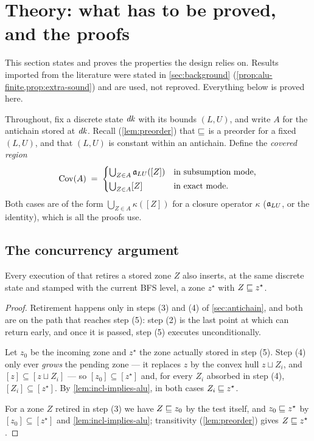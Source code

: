 \section{Theory: what has to be proved, and the proofs}
\label{sec:theory}

This section states and proves the properties the design relies on.  Results
imported from the literature were stated in \cref{sec:background}
(\cref{prop:alu-finite,prop:extra-sound}) and are used, not reproved.
Everything below is proved here.

Throughout, fix a discrete state $\mathit{dk}$ with its bounds $(L,U)$, and write
$A$ for the antichain stored at $\mathit{dk}$.  Recall (\cref{lem:preorder}) that
$\sqsubseteq$ is a preorder for a fixed $(L,U)$, and that $(L,U)$ is constant within
an antichain.  Define the \emph{covered region}
\[
  \mathrm{Cov}(A) \;=\;
  \begin{cases}
    \bigcup_{Z \in A} \mathfrak{a}_{LU}([Z]) & \text{in subsumption mode,}\\[2pt]
    \bigcup_{Z \in A} [Z]       & \text{in exact mode.}
  \end{cases}
\]
Both cases are of the form $\bigcup_{Z\in A} \kappa([Z])$ for a closure
operator $\kappa$ ($\mathfrak{a}_{LU}$, or the identity), which is all the proofs use.

\subsection{The concurrency argument}

\begin{lemma}[Replacement]\label{lem:replacement}
Every execution of  that retires a stored zone $Z$ also inserts, at
the same discrete state and stamped with the current BFS level, a zone $z^\star$
with $Z \sqsubseteq z^\star$.
\end{lemma}

\begin{proof}
Retirement happens only in steps (3) and (4) of \cref{sec:antichain}, and both
are on the path that reaches step (5): step (2) is the last point at which
 can return early, and once it is passed, step (5) executes
unconditionally.

Let $z_0$ be the incoming zone and $z^\star$ the zone actually stored in step
(5).  Step (4) only ever \emph{grows} the pending zone --- it replaces $z$ by the
convex hull $z \sqcup Z_i$, and $[z] \subseteq [z \sqcup Z_i]$ --- so
$[z_0] \subseteq [z^\star]$ and, for every $Z_i$ absorbed in step (4),
$[Z_i] \subseteq [z^\star]$.  By \cref{lem:incl-implies-alu}, in both cases
$Z_i \sqsubseteq z^\star$.

For a zone $Z$ retired in step (3) we have $Z \sqsubseteq z_0$ by the test itself,
and $z_0 \sqsubseteq z^\star$ by $[z_0] \subseteq [z^\star]$ and
\cref{lem:incl-implies-alu}; transitivity (\cref{lem:preorder}) gives
$Z \sqsubseteq z^\star$.
\end{proof}


